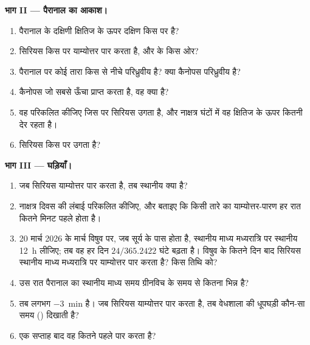 \begin{problem}
\medskip
\noindent\textbf{भाग II --- पैरानाल का आकाश।}
\begin{enumerate}[resume]
  \item पैरानाल के दक्षिणी क्षितिज के ऊपर दक्षिण  किस  पर है?
  \item सिरियस किस  पर याम्योत्तर पार करता है, और  के किस ओर?
  \item पैरानाल पर कोई तारा किस  से नीचे परिध्रुवीय है? क्या कैनोपस परिध्रुवीय है?
  \item कैनोपस जो सबसे ऊँचा  प्राप्त करता है, वह क्या है?
  \item वह  परिकलित कीजिए जिस पर सिरियस उगता है, और नाक्षत्र घंटों में वह क्षितिज के
        ऊपर कितनी देर रहता है।
  \item सिरियस किस  पर उगता है?
\end{enumerate}

\medskip
\noindent\textbf{भाग III --- घड़ियाँ।}
\begin{enumerate}[resume]
  \item जब सिरियस याम्योत्तर पार करता है, तब स्थानीय  क्या है?
  \item नाक्षत्र दिवस की लंबाई परिकलित कीजिए, और बताइए कि किसी तारे का याम्योत्तर-पारण हर रात
        कितने मिनट पहले होता है।
  \item 20 मार्च 2026 के मार्च विषुव पर, जब सूर्य  के पास होता है, स्थानीय माध्य
        मध्यरात्रि पर स्थानीय  \qty{12}{h} लीजिए; तब वह हर दिन $24/365.2422$ घंटे बढ़ता
        है। विषुव के कितने दिन बाद सिरियस स्थानीय माध्य मध्यरात्रि पर याम्योत्तर पार करता है?
        किस तिथि को?
  \item उस रात पैरानाल का स्थानीय माध्य समय ग्रीनविच के समय से कितना भिन्न है?
  \item {} तब लगभग \qty{-3}{min} है। जब सिरियस याम्योत्तर पार करता है, तब वेधशाला की
        धूपघड़ी कौन-सा समय () दिखाती है?
  \item एक सप्ताह बाद वह कितने पहले पार करता है?
\end{enumerate}


\end{problem}
